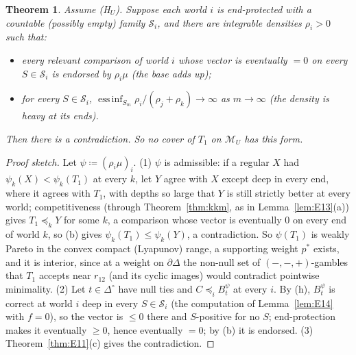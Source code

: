 \documentclass[11pt]{article}
\newtheorem{theorem}{Theorem}[section]
\theoremstyle{definition}
\theoremstyle{remark}
\newcommand{\Di}{\Delta^{\circ}}
\newcommand{\M}{\mathcal M}
\begin{document}
\begin{theorem}\label{thm:E15}
Assume (H$_U$). Suppose each world $i$ is end-protected with a countable (possibly empty) family $\mathcal S_i$, and there are integrable densities $\rho_i>0$ such that:
\begin{itemize}[leftmargin=*]
\item[\textbf{(b)}] every relevant comparison of world $i$ whose vector is eventually $=0$ on every $S\in\mathcal S_i$ is endorsed by $\rho_i\mu$ (the \emph{base adds up});
\item[\textbf{(h)}] for every $S\in\mathcal S_i$, $\operatorname{ess\,inf}_{S_m}\rho_i/(\rho_j+\rho_k)\to\infty$ as $m\to\infty$ (the density is \emph{heavy at its ends}).
\end{itemize}
Then there is a contradiction. So no cover of $T_1$ on $\M_U$ has this form.
\end{theorem}
\begin{proof}[Proof sketch]
Let $\psi\coloneqq(\rho_i\mu)_i$. (1) $\psi$ is admissible: if a regular $X$ had $\psi_k(X)<\psi_k(T_1)$ at every $k$, let $Y$ agree with $X$ except deep in every end, where it agrees with $T_1$, with depths so large that $Y$ is still strictly better at every world; competitiveness (through Theorem~\ref{thm:kkm}, as in Lemma~\ref{lem:E13}(a)) gives $T_1\preceq_kY$ for some $k$, a comparison whose vector is eventually $0$ on every end of world $k$, so (b) gives $\psi_k(T_1)\le\psi_k(Y)$, a contradiction. So $\psi(T_1)$ is weakly Pareto in the convex compact (Lyapunov) range, a supporting weight $p^*$ exists, and it is interior, since at a weight on $\partial\Delta$ the non-null set of $(-,-,+)$-gambles that $T_1$ accepts near $r_{12}$ (and its cyclic images) would contradict pointwise minimality. (2) Let $t\in\Di$ have null ties and $C\preceq_iB^\psi_t$ at every $i$. By (h), $B^\psi_t$ is correct at world $i$ deep in every $S\in\mathcal S_i$ (the computation of Lemma~\ref{lem:E14} with $f=0$), so the vector is $\le0$ there and $S$-positive for no $S$; end-protection makes it eventually $\ge0$, hence eventually $=0$; by (b) it is endorsed. (3) Theorem~\ref{thm:E11}(c) gives the contradiction.
\end{proof}
\end{document}
